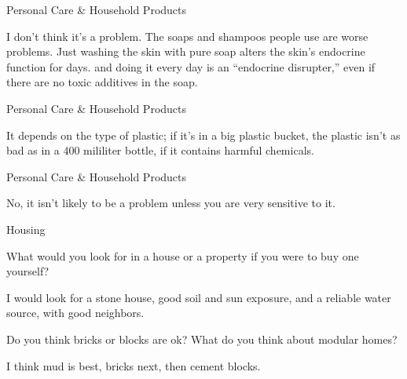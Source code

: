 \documentclass[11pt,oneside,openany,extrafontsizes]{memoir}
\begin{document}
\begin{standalonequote}{Personal Care \& Household Products}

    \begin{answer}
        I don't think it's a problem. The soaps and shampoos people use are worse problems. Just washing the skin with pure soap alters the skin's endocrine function for days. and doing it every day is an \enquote{endocrine disrupter,} even if there are no toxic additives in the soap.
    \end{answer}
\end{standalonequote}

\begin{standalonequote}{Personal Care \& Household Products}

    \begin{answer}
        It depends on the type of plastic; if it's in a big plastic bucket, the plastic isn't as bad as in a 400 mililiter bottle, if it contains harmful chemicals.
    \end{answer}
\end{standalonequote}

\begin{standalonequote}{Personal Care \& Household Products}

    \begin{answer}
        No, it isn't likely to be a problem unless you are very sensitive to it.
    \end{answer}
\end{standalonequote}

\begin{emailexchange}{Housing}

    \begin{question}
        What would you look for in a house or a property if you were to buy one yourself?
    \end{question}

    \begin{answer}
        I would look for a stone house, good soil and sun exposure, and a reliable water source, with good neighbors.
    \end{answer}

    \begin{question}
        Do you think bricks or blocks are ok? What do you think about modular homes?
    \end{question}

    \begin{answer}
        I think mud is best, bricks next, then cement blocks.
    \end{answer}
\end{emailexchange}
\end{document}
